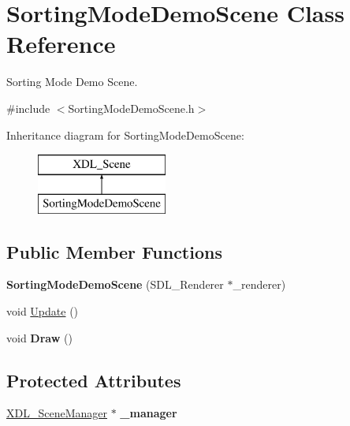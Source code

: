 \hypertarget{class_sorting_mode_demo_scene}{\section{Sorting\-Mode\-Demo\-Scene Class Reference}
\label{class_sorting_mode_demo_scene}
}


Sorting Mode Demo Scene.  




{\ttfamily \#include $<$Sorting\-Mode\-Demo\-Scene.\-h$>$}

Inheritance diagram for Sorting\-Mode\-Demo\-Scene\-:\begin{figure}[H]
\begin{center}
\leavevmode
\includegraphics[height=2.000000cm]{class_sorting_mode_demo_scene}
\end{center}
\end{figure}
\subsection*{Public Member Functions}
\begin{DoxyCompactItemize}
\item 
\hypertarget{class_sorting_mode_demo_scene_a80094b022ddd1413ea8d2624f760fc2d}{{\bfseries Sorting\-Mode\-Demo\-Scene} (S\-D\-L\-\_\-\-Renderer $\ast$\-\_\-renderer)}\label{class_sorting_mode_demo_scene_a80094b022ddd1413ea8d2624f760fc2d}

\item 
void \hyperlink{class_sorting_mode_demo_scene_a1f9386ddf2ce99b05c52f4abfe802a01}{Update} ()
\item 
\hypertarget{class_sorting_mode_demo_scene_a042de7a786ad92fdde35ecf0839b7438}{void {\bfseries Draw} ()}\label{class_sorting_mode_demo_scene_a042de7a786ad92fdde35ecf0839b7438}

\end{DoxyCompactItemize}
\subsection*{Protected Attributes}
\begin{DoxyCompactItemize}
\item 
\hypertarget{class_sorting_mode_demo_scene_af2dddb0ffde8ad7fd7364ec4eced3b42}{\hyperlink{class_x_d_l___scene_manager}{X\-D\-L\-\_\-\-Scene\-Manager} $\ast$ {\bfseries \-\_\-manager}}\label{class_sorting_mode_demo_scene_af2dddb0ffde8ad7fd7364ec4eced3b42}

\end{DoxyCompactItemize}
